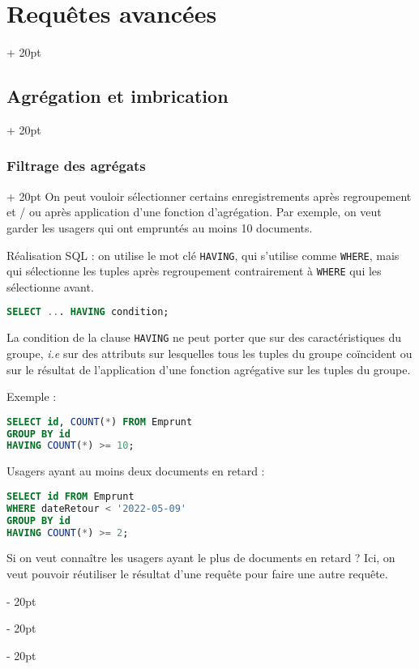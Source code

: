 \documentclass[a4paper, 12pt, twoside]{article}
\newcommand{\ind}[1][20pt]{\advance\leftskip + #1}
\newcommand{\deind}[1][20pt]{\advance\leftskip - #1}
\newenvironment{indt}[2][20pt]{#2 \par \ind[#1]}{\par \deind} %
\begin{document}
\begin{indt}{\section{Requêtes avancées}}
\begin{indt}{\subsection{Agrégation et imbrication}}
            \begin{indt}{\subsubsection{Filtrage des agrégats}}
                On peut vouloir sélectionner certains enregistrements après regroupement et / ou après application d'une fonction d'agrégation. Par exemple, on veut garder les usagers qui ont empruntés au moins 10 documents. 

                Réalisation SQL : on utilise le mot clé \texttt{HAVING}, qui s'utilise comme \texttt{WHERE}, mais qui sélectionne les tuples après regroupement contrairement à \texttt{WHERE} qui les sélectionne avant.

                \begin{lstlisting}[language=SQL, xleftmargin=80pt]
SELECT ... HAVING condition;\end{lstlisting}

                La condition de la clause \texttt{HAVING} ne peut porter que sur des caractéristiques du groupe, \textit{i.e} sur des attributs sur lesquelles tous les tuples du groupe coïncident ou sur le résultat de l'application d'une fonction agrégative sur les tuples du groupe.
                
                Exemple :

                \begin{lstlisting}[language=SQL, xleftmargin=80pt]
SELECT id, COUNT(*) FROM Emprunt
GROUP BY id
HAVING COUNT(*) >= 10;\end{lstlisting}

                \vspace{6pt}
                
                Usagers ayant au moins deux documents en retard :

                \begin{lstlisting}[language=SQL, xleftmargin=80pt]
SELECT id FROM Emprunt
WHERE dateRetour < '2022-05-09'
GROUP BY id
HAVING COUNT(*) >= 2;\end{lstlisting}

                Si on veut connaître les usagers ayant le plus de documents en retard ?
                Ici, on veut pouvoir réutiliser le résultat d'une requête pour faire une autre requête.
            \end{indt}

            \vspace{12pt}
            

\end{indt}
\end{indt}
\end{document}

